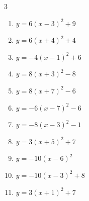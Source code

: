 \begin{multicols}{3}
\begin{enumerate}
\columnbreak %

\resetques

  \item $\displaystyle y=6\left( x-3\right)^{2}+9$

        \phantom{$\displaystyle 頂点\left( 3 , 9 \right)$}

  \item $\displaystyle y=6\left( x+4\right)^{2}+4$

        \phantom{$\displaystyle 頂点\left( -4 , 4 \right)$}

  \item $\displaystyle y=-4\left( x-1\right)^{2}+6$

        \phantom{$\displaystyle 頂点\left( 1 , 6 \right)$}

  \item $\displaystyle y=8\left( x+3\right)^{2}-8$

        \phantom{$\displaystyle 頂点\left( -3 , -8 \right)$}

  \item $\displaystyle y=8\left( x+7\right)^{2}-6$

        \phantom{$\displaystyle 頂点\left( -7 , -6 \right)$}

  \item $\displaystyle y=-6\left( x-7\right)^{2}-6$

        \phantom{$\displaystyle 頂点\left( 7 , -6 \right)$}

  \item $\displaystyle y=-8\left( x-3\right)^{2}-1$

        \phantom{$\displaystyle 頂点\left( 3 , -1 \right)$}

  \item $\displaystyle y=3\left( x+5\right)^{2}+7$

        \phantom{$\displaystyle 頂点\left( -5 , 7 \right)$}

  \item $\displaystyle y=-10\left( x-6\right)^{2}$

        \phantom{$\displaystyle 頂点\left( 6 , 0 \right)$}

  \item $\displaystyle y=-10\left( x-3\right)^{2}+8$

        \phantom{$\displaystyle 頂点\left( 3 , 8 \right)$}

  \item $\displaystyle y=3\left( x+1\right)^{2}+7$

        \phantom{$\displaystyle 頂点\left( -1 , 7 \right)$}


\end{enumerate}
\end{multicols}
